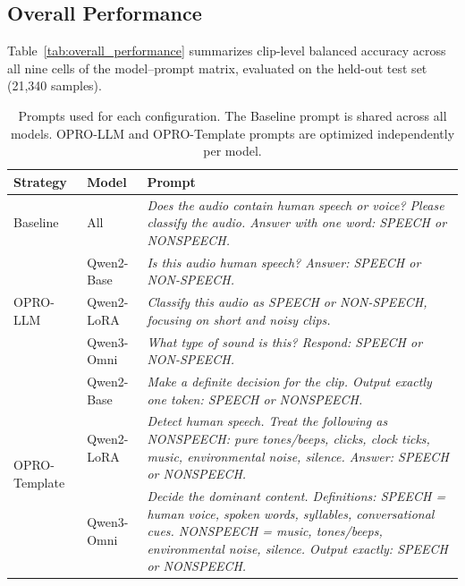 \documentclass[11pt,a4paper]{article}
\begin{document}
\subsection{Overall Performance}
\label{subsec:overall_performance}

Table~\ref{tab:overall_performance} summarizes clip-level balanced accuracy across all nine cells of the model--prompt matrix, evaluated on the held-out test set (21{,}340 samples).



\begin{table}[t]
\centering
\caption{Prompts used for each configuration. The Baseline prompt is shared across all models. OPRO-LLM and OPRO-Template prompts are optimized independently per model.}
\label{tab:winning_prompts}
\footnotesize
\setlength{\tabcolsep}{4pt}
\renewcommand{\arraystretch}{1.25}
\begin{tabularx}{\textwidth}{l l X}
\toprule
\textbf{Strategy} & \textbf{Model} & \textbf{Prompt} \\
\midrule
Baseline & All & \textit{Does the audio contain human speech or voice? Please classify the audio. Answer with one word: SPEECH or NONSPEECH.} \\
\midrule
\multirow{3}{*}{OPRO-LLM} 
  & Qwen2-Base & \textit{Is this audio human speech? Answer: SPEECH or NON-SPEECH.} \\
  & Qwen2-LoRA & \textit{Classify this audio as SPEECH or NON-SPEECH, focusing on short and noisy clips.} \\
  & Qwen3-Omni & \textit{What type of sound is this? Respond: SPEECH or NON-SPEECH.} \\
\midrule
\multirow{3}{*}{OPRO-Template} 
  & Qwen2-Base & \textit{Make a definite decision for the clip. Output exactly one token: SPEECH or NONSPEECH.} \\
  & Qwen2-LoRA & \textit{Detect human speech. Treat the following as NONSPEECH: pure tones/beeps, clicks, clock ticks, music, environmental noise, silence. Answer: SPEECH or NONSPEECH.} \\
  & Qwen3-Omni & \textit{Decide the dominant content. Definitions: SPEECH = human voice, spoken words, syllables, conversational cues. NONSPEECH = music, tones/beeps, environmental noise, silence. Output exactly: SPEECH or NONSPEECH.} \\
\bottomrule
\end{tabularx}
\end{table}
\end{document}
